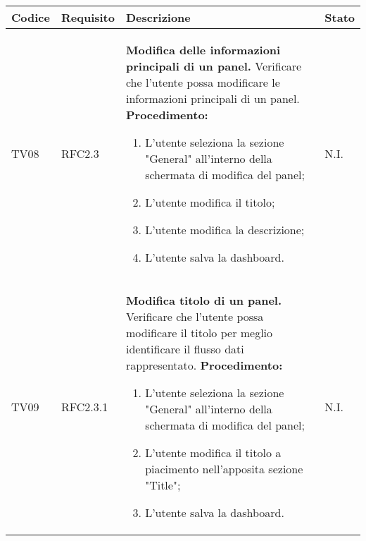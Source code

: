 \begin{table}[!htpb]
	\centering
	\renewcommand{\arraystretch}{2} 
	\begin{tabular}{|l|l|p{10cm}|l|}
		\rowcolor{orange!50}
		\hline
		\textbf{Codice} & \textbf{Requisito}& \textbf{Descrizione} & \textbf{Stato}\\ 
		\hline
		TV08 & RFC2.3 	&
			\textbf{Modifica delle informazioni principali di un panel.}
			\newline
			Verificare che l’utente possa modificare le informazioni principali di un panel. 
			\newline 
			\textbf{Procedimento:}		
			\begin{enumerate} 
				\item L'utente seleziona la sezione "General" all'interno della schermata di modifica del panel; 
				\item L’utente modifica il titolo; 
				\item L’utente modifica la descrizione; 
				\item L'utente salva la dashboard.		
			\end{enumerate} 
			& N.I.\\
		\hline
		TV09 & RFC2.3.1 &
			\textbf{Modifica titolo di un panel.}
			\newline
			Verificare che l'utente possa modificare il titolo per meglio identificare il flusso dati rappresentato.
			\newline
			\textbf{Procedimento:}
			\begin{enumerate}
				\item L'utente seleziona la sezione "General" all'interno della schermata di modifica del panel; 
				\item L’utente modifica il titolo a piacimento nell’apposita sezione "Title"; 
				\item L'utente salva la dashboard.
			\end{enumerate}
			& N.I.\\
		\hline
	\end{tabular}
\end{table}
